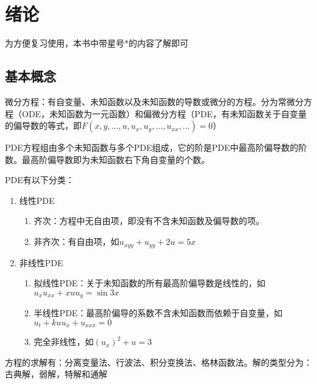 
\chapter{绪论}
 
为方便复习使用，本书中带星号*的内容了解即可

\section{基本概念}

微分方程：有自变量、未知函数以及未知函数的导数或微分的方程。分为常微分方程（ODE，未知函数为一元函数）和偏微分方程（PDE，有未知函数关于自变量的偏导数的等式，即\(F\left(x,y,\ldots,u,u_x,u_y,\ldots,u_{xx},\ldots\right)=0\)）

PDE方程组由多个未知函数与多个PDE组成，它的阶是PDE中最高阶偏导数的阶数。最高阶偏导数即为未知函数右下角自变量的个数。

PDE有以下分类：
\begin{enumerate}
	\item 线性PDE	
	\begin{enumerate}
		\item 齐次：方程中无自由项，即没有不含未知函数及偏导数的项。
		\item 非齐次：有自由项，如\(u_{xyy}+u_{yy}+2u=5x\)
	\end{enumerate}
	\item 非线性PDE	
	\begin{enumerate}
		\item 拟线性PDE：关于未知函数的所有最高阶偏导数是线性的，如\(u_xu_{xx}+xuu_y=\sin{3x}\)
		\item 半线性PDE：最高阶偏导的系数不含未知函数而依赖于自变量，如\(u_t+kuu_x+u_{xxx}=0\)
		\item 完全非线性，如\(\left(u_x\right)^2+u=3\)
	\end{enumerate}
\end{enumerate}

方程的求解有：分离变量法、行波法、积分变换法、格林函数法。解的类型分为：古典解，弱解，特解和通解	

